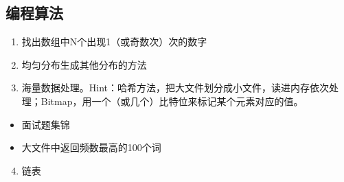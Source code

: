 \documentclass[letterpaper,10pt,english]{sphinxmanual}
\begin{document}
\subsection{编程算法}
\label{\detokenize{else/01_interview:id3}}\begin{enumerate}
\item {} 
找出数组中N个出现1（或奇数次）次的数字

\end{enumerate}
\begin{quote}

\end{quote}
\begin{enumerate}
\setcounter{enumi}{1}
\item {} 
均匀分布生成其他分布的方法

\end{enumerate}
\begin{quote}

\end{quote}
\begin{enumerate}
\setcounter{enumi}{2}
\item {} 
海量数据处理。Hint：哈希方法，把大文件划分成小文件，读进内存依次处理；Bitmap，用一个（或几个）比特位来标记某个元素对应的值。

\end{enumerate}
\begin{itemize}
\item {} 
面试题集锦
\begin{quote}

\end{quote}

\item {} 
大文件中返回频数最高的100个词
\begin{quote}

\end{quote}

\end{itemize}
\begin{enumerate}
\setcounter{enumi}{3}
\item {} 
链表

\end{enumerate}
\end{document}
